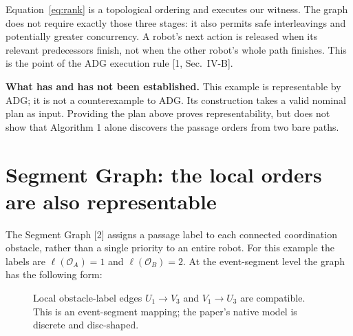 \documentclass[11pt,a4paper]{article}
\begin{document}
Equation~\eqref{eq:rank} is a topological ordering and executes our witness.
The graph does not require exactly those three stages: it also permits safe
interleavings and potentially greater concurrency. A robot's next action is
released when its relevant predecessors finish, not when the other robot's whole
path finishes. This is the point of the ADG execution rule [1, Sec.~IV-B].

\textbf{What has and has not been established.} This example is representable
by ADG; it is not a counterexample to ADG. Its construction takes a valid nominal
plan as input. Providing the plan above proves representability, but does not
show that Algorithm 1 alone discovers the passage orders from two bare paths.

\clearpage
\section{Segment Graph: the local orders are also representable}
The Segment Graph [2] assigns a passage label to each connected coordination
obstacle, rather than a single priority to an entire robot. For this example
the labels are $\ell(\mathcal O_A)=1$ and $\ell(\mathcal O_B)=2$.
At the event-segment level the graph has the following form:
\begin{figure}[h]
\centering
{}
\caption{Local obstacle-label edges $U_1\to V_3$ and $V_1\to U_3$ are compatible.
This is an event-segment mapping; the paper's native model is discrete and disc-shaped.}
\end{figure}
\end{document}
